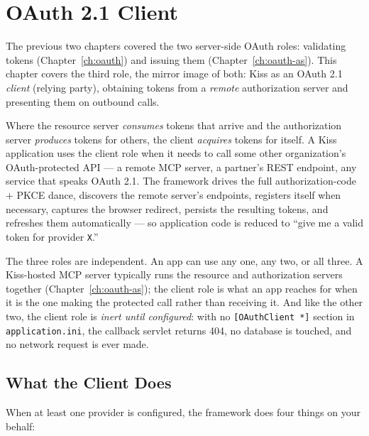\chapter{OAuth 2.1 Client}
\label{ch:oauth-client}

The previous two chapters covered the two server-side OAuth roles: validating tokens (Chapter~\ref{ch:oauth}) and issuing them (Chapter~\ref{ch:oauth-as}).  This chapter covers the third role, the mirror image of both: Kiss as an OAuth 2.1 \emph{client} (relying party), obtaining tokens from a \emph{remote} authorization server and presenting them on outbound calls.

Where the resource server \emph{consumes} tokens that arrive and the authorization server \emph{produces} tokens for others, the client \emph{acquires} tokens for itself.  A Kiss application uses the client role when it needs to call some other organization's OAuth-protected API --- a remote MCP server, a partner's REST endpoint, any service that speaks OAuth 2.1.  The framework drives the full authorization-code + PKCE dance, discovers the remote server's endpoints, registers itself when necessary, captures the browser redirect, persists the resulting tokens, and refreshes them automatically --- so application code is reduced to ``give me a valid token for provider \texttt{X}.''

The three roles are independent.  An app can use any one, any two, or all three.  A Kiss-hosted MCP server typically runs the resource and authorization servers together (Chapter~\ref{ch:oauth-as}); the client role is what an app reaches for when it is the one making the protected call rather than receiving it.  And like the other two, the client role is \emph{inert until configured}: with no \texttt{[OAuthClient *]} section in \texttt{application.ini}, the callback servlet returns 404, no database is touched, and no network request is ever made.

\section{What the Client Does}
\label{sec:oc-overview}

When at least one provider is configured, the framework does four things on your behalf:

